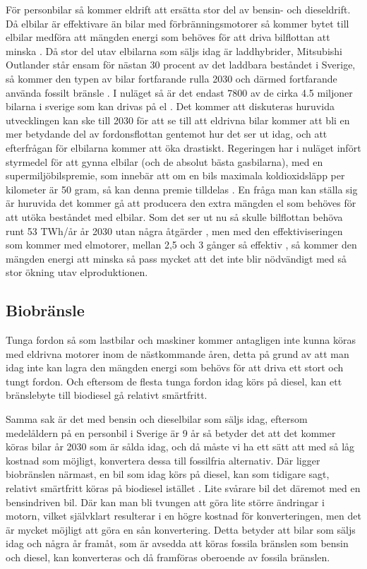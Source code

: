 \documentclass[a4paper,11pt,fleqn, titlepage]{article}
\begin{document}
För personbilar så kommer eldrift att ersätta stor del av bensin- och
dieseldrift. Då elbilar är effektivare än bilar med förbränningsmotorer så
kommer bytet till elbilar medföra att mängden energi som behöves för att
driva bilflottan att minska \cite[s.~25]{elforsk}. Då stor del utav
elbilarna som säljs idag är laddhybrider, Mitsubishi Outlander står ensam
för nästan 30 procent av det laddbara beståndet i Sverige, så kommer den
typen av bilar fortfarande rulla 2030 och därmed fortfarande använda
fossilt bränsle \cite{laddbarafordon}. I nuläget så är det endast
7800 av de cirka 4.5 miljoner bilarna i sverige som kan drivas på
el \cite{fordonsstatistik}.  Det kommer att diskuteras huruvida 
utvecklingen kan ske till 2030 för att se till att eldrivna bilar kommer
att bli en mer betydande del av fordonsflottan gentemot hur det ser ut
idag, och att efterfrågan för elbilarna kommer att öka drastiskt.
Regeringen har i nuläget infört styrmedel för att gynna elbilar
(och de absolut bästa gasbilarna), med en supermiljöbilspremie, som innebär
att om en bils maximala koldioxidsläpp per kilometer är 50 gram, så kan denna
premie tilldelas \cite{ekonomiskastyrmedel}.
En fråga man kan ställa sig är huruvida det kommer gå att producera den
extra mängden el som behöves för att utöka beståndet med elbilar. Som det
ser ut nu så skulle bilflottan behöva runt 53 TWh/år år 2030 utan några
åtgärder \cite[s.~24]{elforsk}, men med
den effektiviseringen som kommer med elmotorer, mellan 2,5 och 3 gånger så
effektiv \cite[s.~29]{elforsk}, så kommer den
mängden energi att minska så pass mycket att det inte blir nödvändigt med
så stor ökning utav elproduktionen.

\subsection{Biobränsle}
Tunga fordon så som lastbilar och maskiner kommer antagligen inte kunna
köras med eldrivna motorer inom de nästkommande åren, detta på grund av att
man idag inte kan lagra den mängden energi som behövs för att driva ett
stort och tungt fordon. Och eftersom de flesta tunga fordon idag körs på
diesel, kan ett bränslebyte till biodiesel gå relativt smärtfritt.

Samma sak är det med bensin och dieselbilar som säljs idag, eftersom
medelåldern på en personbil i Sverige är 9 år \cite[s.~17]{elforsk} så
betyder det att det kommer köras bilar år 2030 som är sålda idag,
och då måste vi ha ett sätt att med så låg kostnad som möjligt, konvertera
dessa till fossilfria alternativ. Där ligger biobränslen närmast, en bil
som idag körs på diesel, kan som tidigare sagt, relativt smärtfritt köras
på biodiesel istället \cite{statoil}. Lite
svårare bil det däremot med en bensindriven bil. Där kan man bli tvungen
att göra lite större ändringar i motorn, vilket självklart resulterar i en
högre kostnad för konverteringen, men det är mycket möjligt att göra en sån
konvertering. Detta betyder att bilar som säljs idag och några år framåt,
som är avsedda att köras fossila bränslen som bensin och diesel, kan
konverteras och då framföras oberoende av fossila bränslen.
\end{document}
